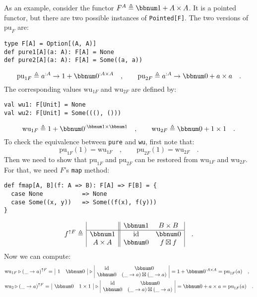 As an example, consider the functor $F^{A}\triangleq\bbnum 1+A\times A$.
It is a pointed functor, but there are two possible instances of \lstinline!Pointed[F]!.
The two versions of $\text{pu}_{F}$ are:
\begin{lstlisting}
type F[A] = Option[(A, A)]
def pure1[A](a: A): F[A] = None
def pure2[A](a: A): F[A] = Some((a, a))
\end{lstlisting}
\[
\text{pu}_{1F}\triangleq a^{:A}\rightarrow1+\bbnum 0^{:A\times A}\quad,\quad\quad\text{pu}_{2F}\triangleq a^{:A}\rightarrow\bbnum 0+a\times a\quad.
\]
The corresponding values $\text{wu}_{1F}$ and $\text{wu}_{2F}$ are
defined by:
\begin{lstlisting}
val wu1: F[Unit] = None
val wu2: F[Unit] = Some(((), ()))
\end{lstlisting}
\[
\text{wu}_{1F}\triangleq1+\bbnum 0^{:\bbnum 1\times\bbnum 1}\quad,\quad\quad\text{wu}_{2F}\triangleq\bbnum 0+1\times1\quad.
\]
To check the equivalence between \lstinline!pure! and \lstinline!wu!,
first note that:
\[
\text{pu}_{1F}(1)=\text{wu}_{1F}\quad,\quad\quad\text{pu}_{2F}(1)=\text{wu}_{2F}\quad.
\]
Then we need to show that $\text{pu}_{1F}$ and $\text{pu}_{2F}$
can be restored from $\text{wu}_{1F}$ and $\text{wu}_{2F}$. For
that, we need $F$\textsf{'}s \lstinline!map! method:
\begin{lstlisting}
def fmap[A, B](f: A => B): F[A] => F[B] = {
  case None           => None
  case Some((x, y))   => Some((f(x), f(y)))
}
\end{lstlisting}
\[
f^{\uparrow F}\triangleq\,\begin{array}{|c||cc|}
 & \bbnum 1 & B\times B\\
\hline \bbnum 1 & \text{id} & \bbnum 0\\
A\times A & \bbnum 0 & f\boxtimes f
\end{array}\quad.
\]
Now we can compute:
\begin{align*}
 & \text{wu}_{1F}\triangleright(\_\rightarrow a)^{\uparrow F}=\,\begin{array}{|cc|}
1 & \bbnum 0\end{array}\,\triangleright\,\begin{array}{|cc|}
\text{id} & \bbnum 0\\
\bbnum 0 & (\_\rightarrow a)\boxtimes(\_\rightarrow a)
\end{array}\,=1+\bbnum 0^{:A\times A}=\text{pu}_{1F}(a)\quad,\\
 & \text{wu}_{2}\triangleright(\_\rightarrow a)^{\uparrow F}=\,\begin{array}{|cc|}
\bbnum 0 & 1\times1\end{array}\,\triangleright\,\begin{array}{|cc|}
\text{id} & \bbnum 0\\
\bbnum 0 & (\_\rightarrow a)\boxtimes(\_\rightarrow a)
\end{array}\,=\bbnum 0+a\times a=\text{pu}_{1F}(a)\quad.
\end{align*}


